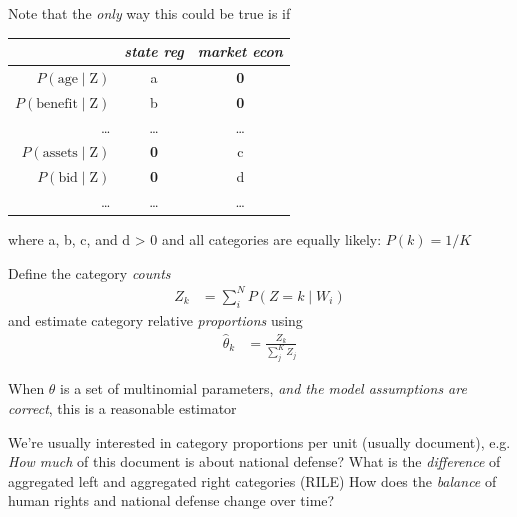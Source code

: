\documentclass{mediumfoils}
\begin{document}

Note that the \textit{only} way this could be true is if 
\begin{center}
\begin{tabular}{rcc} \toprule
 & \textsl{state reg} & \textsl{market econ} \\ \midrule
$P(\text{age} \mid \text{Z})$ & a & \textbf{0} \\
$P(\text{benefit} \mid \text{Z})$ & b & \textbf{0} \\
\ldots & \ldots & \ldots\\
$P(\text{assets} \mid  \text{Z})$ & \textbf{0} & c \\
$P(\text{bid}  \mid  \text{Z})$& \textbf{0} & d\\
\ldots & \ldots & \ldots\\ \bottomrule
\end{tabular}
\end{center}
where a, b, c, and d > 0
{and} all categories are equally likely: $P(k)=1/K$



Define the category \textit{counts}
\begin{align*}
Z_k & = \sum^N_{i} P(Z = k \mid W_i)
\end{align*}
and estimate category relative \textit{proportions} using
\begin{align*}
\hat{\theta}_k &= \frac{Z_k}{\sum^K_{j} Z_j}
\end{align*}

When $\theta$ is a set of multinomial parameters, \textit{and the model assumptions are correct},
this is a reasonable estimator





We're usually interested in category proportions per unit (usually document), e.g.
\ita
\itm \textsl{How much} of this document is about national defense?
\itm What is the \textsl{difference} of aggregated left and aggregated right categories (RILE)
\itm How does the \textsl{balance} of human rights and national defense change over time?
\itz


\end{document}

